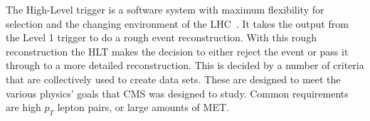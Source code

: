 The High-Level trigger is a software system with maximum flexibility for selection and the changing environment of the LHC~\cite{Cittolin:578006}.  It takes the output from the Level 1 trigger to do a rough event reconstruction.  With this rough reconstruction the HLT makes the decision to either reject the event or pass it through to a more detailed reconstruction.  This is decided by a number of criteria that are collectively used to create data sets.  These are designed to meet the various physics' goals that CMS was designed to study. Common requirements are high $p_T$ lepton pairs, or large amounts of MET.%
